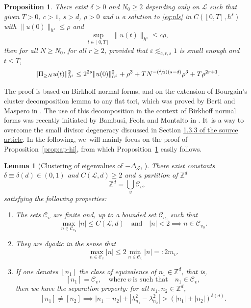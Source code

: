 \documentclass[10pt]{amsart}
\newcommand{\Psfrac}[2]{(\sfrac{#1}{#2})}
\theoremstyle{plain}
\newtheorem{proposition}[theorem]{Proposition}
\newtheorem{lemma}[theorem]{Lemma}
\theoremstyle{definition}
\newcommand{\Z}{\mathbb{Z}}
\newcommand{\1}{\mathbf{1}}
\begin{document}
\begin{proposition}
\label{prop:high_modes} There exist $\delta >0$ and $N_0\geq 2$ depending only on $\mathscr{L}$ such that given $T>0$, $c>1$, $s>d$, $\rho>0$ and $u$ a solution to \eqref{eq:nls} in $C([0,T],h^{s})$ with $\|u(0)\|_{h^{s}} \leq \rho$ and
\begin{equation}
\label{eq:as-ap}
\underset{t\in[0,T]}{\sup}\ \|u(t)\|_{h^{s}}\leq c\rho,
\end{equation}
then for all $N\geq N_0$, for all $r\geq2$, provided that $\varepsilon \lesssim_{c,r,s} 1$ is small enough and $t\leq T$,
\[
\| \Pi_{\geq N} u(t) \|_{h^s}^2 \leq 2^{2s} \| u(0) \|_{h^s}^2 + \rho^3 + TN^{-\Psfrac{\delta}{2}(s-d)} \rho^{3}+T \rho^{2r+1}.
\]
\end{proposition}

The proof is based on Birkhoff normal forms, and on the extension of Bourgain's cluster decomposition lemma \cite{Bou98} to any flat tori, which was proved by Berti and Maspero in \cite[Th.\,2.1]{Berti-Maspero-19}. The use of this decomposition in the context of Birkhoff normal forms was recently initiated by Bambusi, Feola and Montalto in \cite{BFM22}. It~is a way to overcome the small divisor degeneracy discussed in Section \href{https://doi.org/10.5802/jep.300}{1.3.3 of the source article}. In the following, we~will mainly focus on the proof of Proposition~\ref{prop:ap-hi}, from which Proposition~\ref{prop:high_modes} easily follows.

\begin{lemma}[Clustering of eigenvalues of $-\Delta_\mathscr{L}$, {\cite[Th.\,2.1]{Berti-Maspero-19}}]
\label{lem:cluster}
There exist constants $\delta \equiv \delta(d) \in (0,1)$ and $C(\mathscr{L},d)\geq 2$ and a partition of $\Z^d$
\[
\Z^d = \bigcup_{\upsilon }\mathscr{C}_\upsilon,
\]
satisfying the following properties:
\begin{enumerate}
\item The sets $\mathscr{C}_\upsilon$ are finite and, up to a bounded set $\mathscr{C}_{\upsilon_0}$ such that
\[
\underset{n\in \mathscr{C}_{\upsilon_0}}{\max} |n| \leq C(\mathscr{L},d) \quad \mathrm{and} \quad |n| < 2 \implies n\in \mathscr{C}_{\upsilon_0}.
\]
\item They are dyadic in the sense that
\begin{equation}
\label{eq:dydy}
\underset{n\in\mathscr{C}_{{\upsilon}}}{\max} |n| \leq 2\underset{n\in\mathscr{C}_{{\upsilon}}}{\min} |n| =: 2m_\upsilon.
\end{equation}
\item If one denotes $[n_1]$ the class of equivalence of $n_1\in\Z^d$, that is,
\[
[n_1] = \mathscr{C}_\upsilon,\quad \text{where}\ \upsilon\ \text{is such that}\quad n_1\in\mathscr{C}_\upsilon,
\]
then we have the separation property: for all $n_1,n_2\in\Z^d$,
\[
[n_1]\neq[n_2]\implies |n_1-n_2| + |\lambda_{n_{1}}^{2}-\lambda_{n_{2}}^{2}| > (|n_1|+|n_2|)^{\delta(d)}.
\]
\end{enumerate}
\end{lemma}
\end{document}

